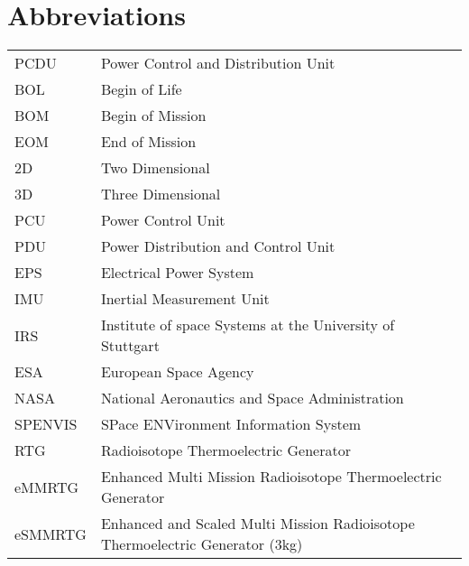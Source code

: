 \chapter*{Abbreviations}
\begin{table}[htb]
\begin{tabular}[l]{ll}
PCDU    & Power Control and Distribution Unit \\
BOL     & Begin of Life \\
BOM     & Begin of Mission \\
EOM     & End of Mission \\
2D		& Two Dimensional \\
3D		& Three Dimensional \\
PCU     & Power Control Unit \\
PDU     & Power Distribution and Control Unit \\
EPS     & Electrical Power System \\
IMU     & Inertial Measurement Unit \\
IRS     & Institute of space Systems at the University of Stuttgart \\
ESA		&	European Space Agency	\\
NASA    &   National Aeronautics and Space Administration \\
SPENVIS	&	SPace ENVironment Information System	\\
RTG     & Radioisotope Thermoelectric Generator \\
eMMRTG  & Enhanced Multi Mission Radioisotope Thermoelectric Generator \\
eSMMRTG & Enhanced and Scaled Multi Mission Radioisotope Thermoelectric Generator (3kg) \\

\end{tabular}
\end{table}


